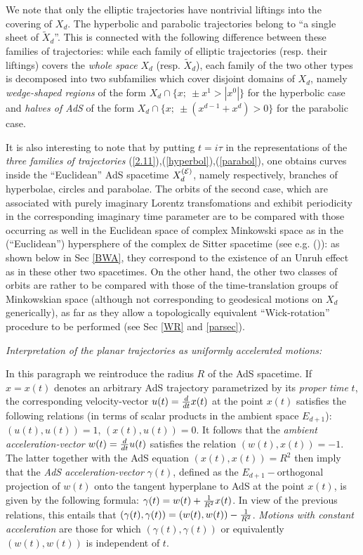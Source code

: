 \documentclass[a4paper,a4paper]{article}
\def\wt{\widetilde}
\begin{document}
\vskip 0.2cm
We note that only the elliptic trajectories have nontrivial
liftings into the covering of $X_d$.
The hyperbolic and parabolic
trajectories belong to ``a single sheet of $\wt X_d$''.
This is connected with the following difference between these families
of trajectories:
while each family of elliptic trajectories
(resp. their liftings) covers the
{\sl whole space} $X_d$ (resp. $\wt X_d$),
each family of the two other types is decomposed into
two subfamilies which cover disjoint domains of $X_d$,
namely {\sl wedge-shaped regions} of the form $X_d \cap \{x ;\
\pm x^1 > |x^0|\}$ for the hyperbolic case and {\sl halves of  AdS}
of the form
$X_d \cap \{x ;\ \pm (x^{d-1} + x^d) >0\}$ for the
parabolic case.


It is also interesting to note that by putting $t=i\tau$
in the representations of the {\sl three families of trajectories}
(\ref{2.11}),(\ref{hyperbol}),(\ref{parabol}), one obtains curves
inside the ``Euclidean'' AdS spacetime $X_d^{({\cal E})}$,
namely respectively, branches of hyperbolae, circles and
parabolae. The orbits of the second case,
which are associated with purely imaginary
Lorentz transfomations and exhibit periodicity
in the corresponding imaginary time
parameter are to be compared with those occurring
as well in the Euclidean space of complex Minkowski space
as in the (``Euclidean'') hypersphere of the
complex de Sitter spacetime (see e.g. (\cite{BEM})):
as shown below in Sec \ref{BWA}, they correspond to
the existence of an Unruh effect as in these other two spacetimes.
On the other hand,
the other two classes of orbits
are rather to be compared with those of the time-translation
groups of Minkowskian space (although not corresponding to
geodesical motions on $X_d$ generically),
as far as they allow a topologically equivalent  ``Wick-rotation''
procedure to be performed (see Sec \ref{WR} and \ref{parsec}).

\vskip 0.3cm
\noindent
{\sl Interpretation of the planar trajectories as
uniformly accelerated motions:}

\vskip 0.2cm
In this paragraph we reintroduce the radius $R$ of the AdS spacetime.
If $x=x(t)$ denotes an arbitrary AdS trajectory parametrized by its
{\sl proper time} $t$, the corresponding velocity-vector
$u(t) = {d\over dt} x(t)$ at the point $x(t)$
satisfies the following relations
(in terms of scalar products in the ambient space $E_{d+1}$):
$ (u(t),u(t)) =1$, $ (x(t),u(t)) =0$. It follows that the  {\sl ambient
acceleration-vector}
$w(t) = {d\over dt} u(t)$
satisfies the relation $(w(t),x(t))  = -1$.
The latter together with the AdS equation $(x(t),x(t)) = R^2$ then
imply that the {\sl AdS acceleration-vector} $\gamma(t)$,
defined as the
$E_{d+1}-$orthogonal projection of $w(t)$ onto the tangent hyperplane
to AdS at the point $x(t)$, is given by the following formula:
$\gamma(t) = w(t) +{1\over R^2} x(t)$.
In view of the previous relations, this entails that
$ (\gamma(t),\gamma(t)) =
(w(t),w(t)) -{1\over R^2}$.
{\sl Motions with constant acceleration} are those for which
$ (\gamma(t),\gamma(t))$ or equivalently
$(w(t),w(t))$ is independent of $t$.
\end{document}
